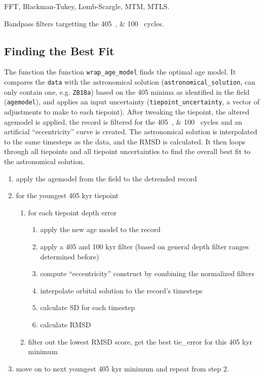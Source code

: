 \documentclass[draft]{agujournal2019}
\begin{document}
FFT, Blackman-Tukey, Lomb-Scargle, MTM, MTLS.

Bandpass filters targetting the \qtylist{405;100}{\kiloyear} cycles.

\subsection{Finding the Best Fit}

The function the function \texttt{wrap\_age\_model} finds the optimal age model.
It compares the \texttt{data} with the astronomical solution (\texttt{astronomical\_solution}, can only contain one, e.g. \texttt{ZB18a}) based on the \qty{405}{\kiloyear} minima as identified in the field (\texttt{agemodel}), and applies an input uncertainty (\texttt{tiepoint\_uncertainty}, a vector of adjustments to make to each tiepoint).
After tweaking the tiepoint, the altered agemodel is applied, the record is filtered for the \qtylist{405;100}{\kiloyear} cycles and an artificial ``eccentricity'' curve is created.
The astronomical solution is interpolated to the same timesteps as the data, and the \gls{RMSD} is calculated.
It then loops through all tiepoints and all tiepoint uncertainties to find the overall best fit to the astronomical solution.


\begin{enumerate}
\item apply the agemodel from the field to the detrended record
\item for the youngest 405 kyr tiepoint
\begin{enumerate}
\item for each tiepoint depth error
\begin{enumerate}
\item apply the new age model to the record
\item apply a 405 and 100 kyr filter (based on general depth filter ranges determined before)
\item compute ``eccentricity'' construct by combining the normalized filters
\item interpolate orbital solution to the record's timesteps
\item calculate SD for each timestep
\item calculate RMSD
\end{enumerate}
\item filter out the lowest RMSD score, get the best tie\_error for this 405 kyr minimum
\end{enumerate}
\item move on to next youngest 405 kyr minimum and repeat from step 2.
\end{enumerate}
\end{document}
